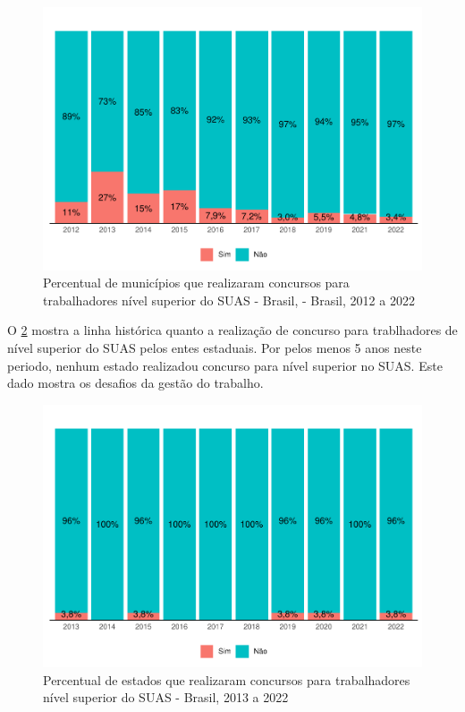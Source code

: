 \documentclass[
  brazilian]{report}
\begin{document}
\begin{figure}
\includegraphics{Censo-SUAS-2022_files/figure-latex/conc_munic-1} \caption[Percentual de municípios que realizaram concursos para trabalhadores nível superior do SUAS - Brasil, - Brasil, 2012 a 2022]{Percentual de municípios que realizaram concursos para trabalhadores nível superior do SUAS - Brasil, - Brasil, 2012 a 2022}\label{fig:conc_munic}
\end{figure}

O \cref{fig:conc_estado} mostra a linha histórica quanto a realização de
concurso para trablhadores de nível superior do SUAS pelos entes
estaduais. Por pelos menos 5 anos neste periodo, nenhum estado
realizadou concurso para nível superior no SUAS. Este dado mostra os
desafios da gestão do trabalho.

\begin{figure}
\includegraphics{Censo-SUAS-2022_files/figure-latex/conc_estado-1} \caption[Percentual de estados que realizaram concursos para trabalhadores nível superior do SUAS - Brasil, 2013 a 2022]{Percentual de estados que realizaram concursos para trabalhadores nível superior do SUAS - Brasil, 2013 a 2022}\label{fig:conc_estado}
\end{figure}
\end{document}
